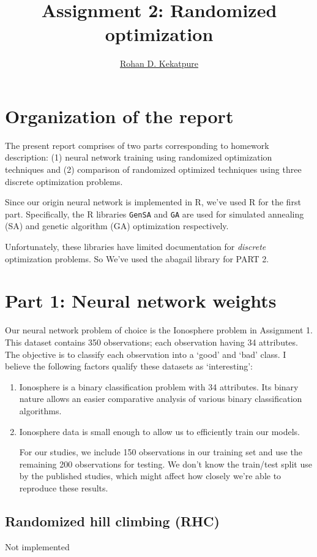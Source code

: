 \documentclass[10pt,letterpaper]{article}
\begin{document}
\title{\Large{Assignment 2: Randomized optimization}}
\author{\href{mailto:rohan.kekatpure@gmail.com}{Rohan D. Kekatpure}}
\address{}
\email{}

\section{Organization of the report}
The present report comprises of two parts corresponding to homework description: (1) neural network training using randomized optimization techniques and (2) comparison of randomized optimized techniques using three discrete optimization problems. 

Since our origin neural network is implemented in R, we've used R for the first part. Specifically, the R libraries {\tt GenSA} and {\tt GA} are used for simulated annealing (SA) and genetic algorithm (GA) optimization respectively.

Unfortunately, these libraries have limited documentation for {\em discrete} optimization problems. So We've used the {\sc abagail} library for PART 2.   

\section{Part 1: Neural network weights}
Our neural network problem of choice is the Ionosphere problem in Assignment 1. This dataset contains 350 observations; each observation having 34 attributes. The objective is to classify each observation into a `good' and `bad' class. I believe the following factors qualify these datasets as `interesting':
\begin{enumerate}
	\item Ionosphere is a binary classification problem with 34 attributes. Its binary nature allows an easier comparative analysis of various binary classification algorithms.  
	\item Ionosphere data is small enough to allow us to efficiently train our models. 

For our studies, we include 150 observations in our training set and use the remaining 200 observations for testing. We don't know the train/test split use by the published studies, which might affect how closely we're able to reproduce these results.

\end{enumerate}

\subsection{Randomized hill climbing (RHC)}
Not implemented
\end{document}
